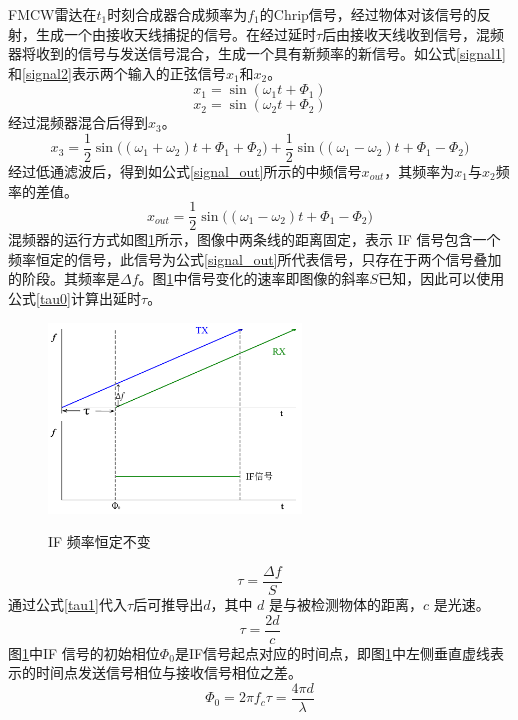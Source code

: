 FMCW雷达在$t_1$时刻合成器合成频率为$f_1$的Chrip信号，经过物体对该信号的反射，生成一个由接收天线捕捉的信号。在经过延时$\tau$后由接收天线收到信号，混频器将收到的信号与发送信号混合，生成一个具有新频率的新信号。如公式\eqref{signal1}和\eqref{signal2}表示两个输入的正弦信号$x_1$和$x_2$。
\begin{equation}
	x_1 = \sin(\omega_1t+\Phi_1)
	\label{signal1}
\end{equation}
\begin{equation}
	x_2 = \sin(\omega_2t+\Phi_2)
	\label{signal2}
\end{equation}
经过混频器混合后得到$x_3$。
\begin{equation}
	x_3 = \frac{1}{2}\sin \big(\left(\omega_1 + \omega_2\right)t + \Phi_1+ \Phi_2\big) + 
	\frac{1}{2}\sin \big(\left(\omega_1 - \omega_2\right)t + \Phi_1- \Phi_2\big) 
\end{equation}
经过低通滤波后，得到如公式\eqref{signal_out}所示的中频信号$x_{out}$，其频率为$x_1$与$x_2$频率的差值。
\begin{equation}
	x_{out} = \frac{1}{2} \sin\big((\omega_1 - \omega_2)t + \Phi_1- \Phi_2\big)
	\label{signal_out}
\end{equation}
混频器的运行方式如图\ref{IF}所示，图像中两条线的距离固定，表示 IF 信号包含一个频率恒定的信号，此信号为公式\eqref{signal_out}所代表信号，只存在于两个信号叠加的阶段。其频率是$\Delta f $。图\ref{IF}中信号变化的速率即图像的斜率$S$已知，因此可以使用公式\eqref{tau0}计算出延时$\tau$。
\begin{figure}[htbp]
	\centering
	\includegraphics[width=0.6\textwidth]{figures/if1.pdf}\\
	\caption{IF 频率恒定不变}
	\label{IF}
\end{figure}

\begin{equation}
	\tau = \frac{\Delta f}{S}
	\label{tau0}
\end{equation}
通过公式\eqref{tau1}代入$\tau$后可推导出$d$，其中 $d$ 是与被检测物体的距离，$c$ 是光速。
\begin{equation}
	\tau = \frac{2d}{c}
	\label{tau1}
\end{equation}
图\ref{IF}中IF 信号的初始相位$\Phi_0$是IF信号起点对应的时间点，即图\ref{IF}中左侧垂直虚线表示的时间点发送信号相位与接收信号相位之差。
\begin{equation}
	\Phi_0 = 2\pi f_c \tau = \frac{4\pi d}{\lambda}
	\label{phi0}
\end{equation}

